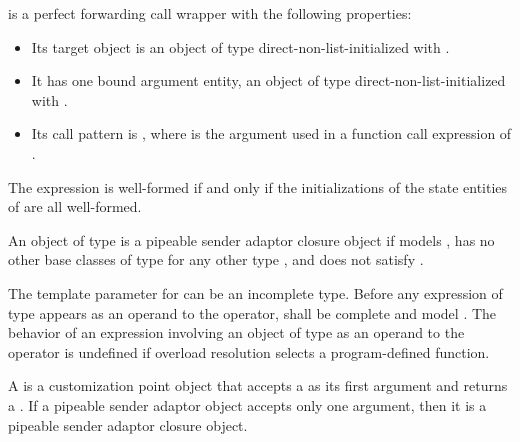  is a perfect forwarding call wrapper
with the following properties:
\begin{itemize}
\item
Its target object is an object  of type 
direct-non-list-initialized with .
\item
It has one bound argument entity,
an object  of type 
direct-non-list-initialized with .
\item
Its call pattern is ,
where  is the argument used in a function call expression of .
\end{itemize}
The expression  is well-formed if and only if
the initializations of the state entities of 
are all well-formed.

\pnum
An object  of type  is
a pipeable sender adaptor closure object
if  models ,
 has no other base classes
of type  for any other type , and
 does not satisfy .

\pnum
The template parameter  for  can be
an incomplete type.
Before any expression of type \cv{}  appears as
an operand to the \tcode{|} operator,
 shall be complete and
model .
The behavior of an expression involving an object of type \cv{} 
as an operand to the \tcode{|} operator is undefined
if overload resolution selects a program-defined  function.

\pnum
A  is a customization point object
that accepts a  as its first argument and
returns a .
If a pipeable sender adaptor object accepts only one argument,
then it is a pipeable sender adaptor closure object.

